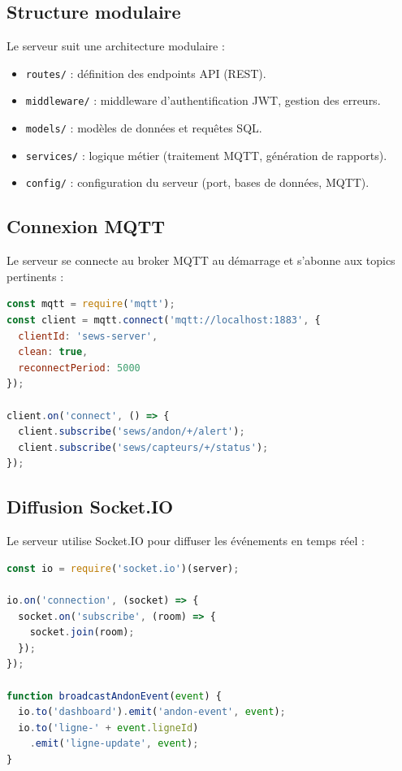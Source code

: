 \subsection{Structure modulaire}

Le serveur suit une architecture modulaire :

\begin{itemize}
    \item \texttt{routes/} : d\'efinition des endpoints API (REST).
    \item \texttt{middleware/} : middleware d'authentification JWT, gestion des erreurs.
    \item \texttt{models/} : mod\`eles de donn\'ees et requ\^etes SQL.
    \item \texttt{services/} : logique m\'etier (traitement MQTT, g\'en\'eration de rapports).
    \item \texttt{config/} : configuration du serveur (port, bases de donn\'ees, MQTT).
\end{itemize}

\subsection{Connexion MQTT}

Le serveur se connecte au broker MQTT au d\'emarrage et s'abonne aux topics pertinents :

\begin{lstlisting}[language=JavaScript,caption={Connexion et abonnement MQTT},label={lst:mqtt_connect}]
const mqtt = require('mqtt');
const client = mqtt.connect('mqtt://localhost:1883', {
  clientId: 'sews-server',
  clean: true,
  reconnectPeriod: 5000
});

client.on('connect', () => {
  client.subscribe('sews/andon/+/alert');
  client.subscribe('sews/capteurs/+/status');
});
\end{lstlisting}

\subsection{Diffusion Socket.IO}

Le serveur utilise Socket.IO pour diffuser les \'ev\'enements en temps r\'eel :

\begin{lstlisting}[language=JavaScript,caption={Diffusion des \'ev\'enements via Socket.IO},label={lst:socketio}]
const io = require('socket.io')(server);

io.on('connection', (socket) => {
  socket.on('subscribe', (room) => {
    socket.join(room);
  });
});

function broadcastAndonEvent(event) {
  io.to('dashboard').emit('andon-event', event);
  io.to('ligne-' + event.ligneId)
    .emit('ligne-update', event);
}
\end{lstlisting}

